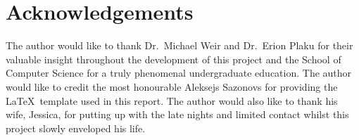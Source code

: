 


\chapter{Acknowledgements}

\label{chapter:ack}

The author would like to thank Dr.\ Michael Weir and Dr.\ Erion Plaku for their
valuable insight throughout the development of this project and the School of
Computer Science for a truly phenomenal undergraduate education. The author
would like to credit the most honourable Aleksejs Sazonovs for providing the
\LaTeX \, template used in this report. The author would also like to thank his
wife, Jessica, for putting up with the late nights and limited contact whilst
this project slowly enveloped his life.


